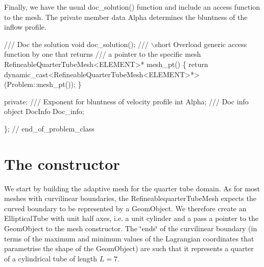 Finally, we have the usual {\ttfamily doc\+\_\+solution()} function and include an access function to the mesh. The private member data {\ttfamily Alpha} determines the bluntness of the inflow profile.


\begin{DoxyCodeInclude}
\textcolor{comment}{}
\textcolor{comment}{ /// Doc the solution}
\textcolor{comment}{} \textcolor{keywordtype}{void} doc\_solution();
\textcolor{comment}{}
\textcolor{comment}{ /// \(\backslash\)short Overload generic access function by one that returns}
\textcolor{comment}{ /// a pointer to the specific  mesh}
\textcolor{comment}{} RefineableQuarterTubeMesh<ELEMENT>* mesh\_pt() 
  \{
   \textcolor{keywordflow}{return} \textcolor{keyword}{dynamic\_cast<}RefineableQuarterTubeMesh<ELEMENT>*\textcolor{keyword}{>}(Problem::mesh\_pt());
  \}

\textcolor{keyword}{private}:
\textcolor{comment}{}
\textcolor{comment}{ /// Exponent for bluntness of velocity profile}
\textcolor{comment}{} \textcolor{keywordtype}{int} Alpha;
 \textcolor{comment}{}
\textcolor{comment}{ /// Doc info object}
\textcolor{comment}{} DocInfo Doc\_info;

\}; \textcolor{comment}{// end\_of\_problem\_class}

\end{DoxyCodeInclude}




 

\hypertarget{index_constructor}{}\section{The constructor}\label{index_constructor}
We start by building the adaptive mesh for the quarter tube domain. As for most meshes with curvilinear boundaries, the {\ttfamily Refineablequarter\+Tube\+Mesh} expects the curved boundary to be represented by a {\ttfamily Geom\+Object}. We therefore create an {\ttfamily Elliptical\+Tube} with unit half axes, i.\+e. a unit cylinder and a pass a pointer to the {\ttfamily Geom\+Object} to the mesh constructor. The \char`\"{}ends\char`\"{} of the curvilinear boundary (in terms of the maximum and minimum values of the Lagrangian coordinates that parametrise the shape of the {\ttfamily Geom\+Object}) are such that it represents a quarter of a cylindrical tube of length $L=7$.


